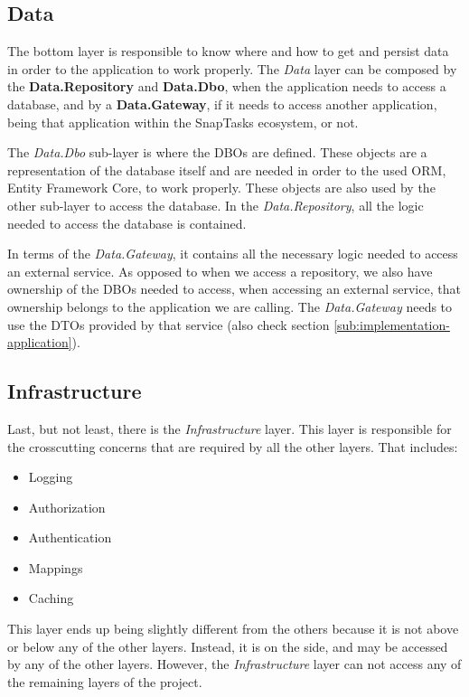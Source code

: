 \subsection{Data}
The bottom layer is responsible to know where and how to get and persist data in order to the application to work properly. The \textit{Data} layer can be composed by the \textbf{Data.Repository} and \textbf{Data.Dbo}, when the application needs to access a database, and by a \textbf{Data.Gateway}, if it needs to access another application, being that application within the SnapTasks ecosystem, or not. 
\par
The \textit{Data.Dbo} sub-layer is where the \glspl{DBO} are defined. These objects are a representation of the database itself and are needed in order to the used \gls{ORM}, Entity Framework Core, to work properly. These objects are also used by the other sub-layer to access the database. In the \textit{Data.Repository}, all the logic needed to access the database is contained.

\par

In terms of the \textit{Data.Gateway}, it contains all the necessary logic needed to access an external service. As opposed to when we access a repository, we also have ownership of the \glspl{DBO} needed to access, when accessing an external service, that ownership belongs to the application we are calling. The \textit{Data.Gateway} needs to use the \glspl{DTO} provided by that service (also check section \ref{sub:implementation-application}).


\subsection{Infrastructure}

Last, but not least, there is the \textit{Infrastructure} layer. This layer is responsible for the crosscutting concerns that are required by all the other layers. That includes:
\begin{itemize}
    \item Logging
    \item Authorization
    \item Authentication
    \item Mappings
    \item Caching
\end{itemize}
\par

This layer ends up being slightly different from the others because it is not above or below any of the other layers. Instead, it is on the side, and may be accessed by any of the other layers. However, the \textit{Infrastructure} layer can not access any of the remaining layers of the project.